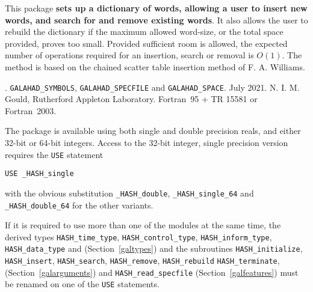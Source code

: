 \documentclass{galahad}
\newcommand{\packagename}{HASH}
\newcommand{\fullpackagename}{\libraryname\_\packagename}
\begin{document}
\galheader


\galsummary
This package {\bf sets up a dictionary of words, allowing a user to insert new
words, and search for and remove existing words}.  It also allows the user
to rebuild the dictionary if the maximum allowed word-size, or the
total space provided, proves too small.  Provided sufficient room is
allowed, the expected number of operations required for an insertion,
search or removal is $O(1)$.  The method is based on the chained
scatter table insertion method of F. A. Williams.


\galattributes
\galversions{\tt  \fullpackagename\_single, \fullpackagename\_double}.
\galuses
{\tt GALAHAD\_SY\-M\-BOLS},
{\tt GALAHAD\-\_SPECFILE}
and
{\tt GALAHAD\_SPACE}.
\galdate July 2021.
\galorigin N. I. M. Gould, Rutherford Appleton Laboratory.
\gallanguage Fortran~95 + TR 15581 or Fortran~2003.


\galhowto

The package is available using both single and double precision reals, 
and either 32-bit or 64-bit integers. Access to the 32-bit integer,
single precision version requires the {\tt USE} statement
\medskip

\hspace{8mm} {\tt USE \fullpackagename\_single}

\medskip
\noindent
with the obvious substitution {\tt \fullpackagename\_double},
{\tt \fullpackagename\_single\_64} and 
{\tt \fullpackagename\_double\_64} for the other variants.

\noindent
If it is required to use more than one of the modules at the same time, 
the derived types
{\tt \packagename\_time\_\-type},
{\tt \packagename\_control\_type},
{\tt \packagename\_inform\_type},
{\tt \packagename\_data\_type}
and
(Section~\ref{galtypes})
and the subroutines
{\tt \packagename\_initialize},
{\tt \packagename\_insert},
{\tt \packagename\-\_search},
{\tt \packagename\_remove},
{\tt \packagename\_rebuild}
{\tt \packagename\_terminate},
(Section~\ref{galarguments})
and
{\tt \packagename\_read\_specfile}
(Section~\ref{galfeatures})
must be renamed on one of the {\tt USE} statements.

\end{document}

